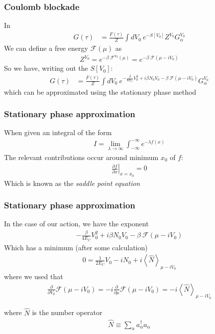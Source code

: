 \documentclass[]{beamer}
\begin{document}
\begin{frame}[t]\frametitle{Coulomb blockade}
  In
  \begin{align*}
    G(\tau) &= \frac{F(\tau)}{Z} \int dV_0 ~ e^{-S[V_0]} Z^{V_0} G_{\alpha}^{V_0}
  \end{align*}
  We can define a free energy $\mathcal{F}(\mu)$ as
  \begin{align*}
    Z^{V_0} = e^{-\beta ~ \mathcal{F}^{V_0}(\mu)} = e^{-\beta ~ \mathcal{F}(\mu - i V_0)}
  \end{align*}
  So we have, writing out the $S[V_0]$:
  \begin{align*}
    G(\tau) &= \frac{F(\tau)}{Z} \int dV_0 ~ e^{-\frac{\beta}{4 E_C} V_0^2 + i \beta N_0 V_0 - \beta ~ \mathcal{F}(\mu - i V_0)} G_{\alpha}^{V_0}
  \end{align*}
  which can be approximated using the stationary phase method
\end{frame}

\begin{frame}[t]\frametitle{Stationary phase approximation}
  When given an integral of the form
  \begin{align*}
    I = \lim_{\lambda \to \infty} \int_{-\infty}^{-\infty} e^{-\lambda f(x)}
  \end{align*}
  The relevant contributions occur around minimum $x_0$ of $f$:
  \begin{align*}
    \left.\frac{\partial f}{\partial x} \right\rvert_{x = x_0} = 0
  \end{align*}
  Which is known as the \emph{saddle point equation}
\end{frame}

\begin{frame}[t]\frametitle{Stationary phase approximation}
  In the case of our action, we have the exponent
  \begin{align*}
    -\frac{\beta}{4 E_C} V_0^2 + i \beta N_0 V_0 - \beta ~ \mathcal{F}(\mu - i V_0)
  \end{align*}
  Which has a minimum (after some calculation)
  \begin{align*}
    0 = \frac{1}{2 E_C} V_0 - i N_0 + i \left<\hat{N}\right>_{\mu - i V_0}
  \end{align*}
  where we used that
  \begin{align*}
    \frac{\partial}{\partial V_0} \mathcal{F}(\mu - i V_0) = - i \frac{\partial}{\partial \mu} \mathcal{F}(\mu - i V_0) = - i \left<\hat{N}\right>_{\mu - i V_0}
  \end{align*}

  where $\hat{N}$ is the number operator
  \begin{align*}
    \hat{N} \equiv \sum_{\alpha} a_{\alpha}^{\dagger} a_{\alpha}
  \end{align*}

\end{frame}
\end{document}
